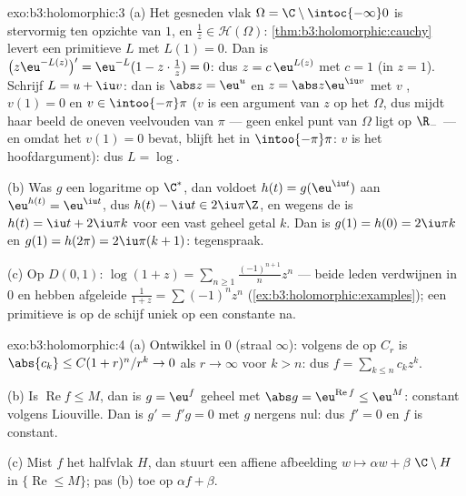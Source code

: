 \begin{solution}{exo:b3:holomorphic:3}
(a) Het gesneden vlak $\Omega = \C\setminus\intoc{-\infty}0$ is
stervormig ten opzichte van $1$, en $\frac1z \in \mathcal
H(\Omega)$: \cref{thm:b3:holomorphic:cauchy} levert een
primitieve $L$ met $L(1) = 0$. Dan is
$\bigl(z\eu^{-L(z)}\bigr)' = \eu^{-L}(1 - z\cdot\frac1z) = 0$:
dus $z = c\,\eu^{L(z)}$ met $c = 1$ (in $z = 1$). Schrijf $L = u
+ \iu v$: dan is $\abs z = \eu^u$ en $z = \abs z\eu^{\iu v}$ met
$v$ , $v(1) = 0$ en $v \in \intoo{-\pi}\pi$ ($v$ is een
 argument van $z$ op het  $\Omega$, dus mijdt
haar beeld de oneven veelvouden van $\pi$ --- geen enkel punt van
$\Omega$ ligt op $\R_-$ --- en omdat het $v(1) = 0$ bevat, blijft
het in $\intoo{-\pi}\pi$: $v$ is het hoofdargument): dus $L =
\log$.

(b) Was $g$ een  logaritme op $\C^*$, dan voldoet $h(t) =
g(\eu^{\iu t})$ aan $\eu^{h(t)} = \eu^{\iu t}$, dus $h(t) - \iu t
\in 2\iu\pi\Z$, en wegens de  is $h(t) = \iu t +
2\iu\pi k$ voor een vast geheel getal $k$. Dan is $g(1) = h(0) =
2\iu\pi k$ en $g(1) = h(2\pi) = 2\iu\pi(k + 1)$: tegenspraak.

(c) Op $D(0,1)$: $\log(1 + z) =
\sum_{n\geq1}\frac{(-1)^{n+1}}{n}z^n$ --- beide leden verdwijnen
in $0$ en hebben afgeleide $\frac1{1+z} = \sum(-1)^nz^n$
(\cref{ex:b3:holomorphic:examples}); een primitieve is op de
 schijf uniek op een constante na.
\end{solution}

\begin{solution}{exo:b3:holomorphic:4}
(a) Ontwikkel in $0$ (straal $\infty$): volgens de  op $C_r$ is $\abs{c_k} \leq C(1 + r)^n/r^k \to 0$ als
$r \to \infty$ voor $k > n$: dus $f = \sum_{k\leq n}c_kz^k$.

(b) Is $\operatorname{Re}f \leq M$, dan is $g = \eu^f$ geheel met
$\abs g = \eu^{\operatorname{Re}f} \leq \eu^M$: constant volgens
Liouville. Dan is $g' = f'g = 0$ met $g$ nergens nul: dus $f' =
0$ en $f$ is constant.

(c) Mist $f$ het halfvlak $H$, dan stuurt een affiene afbeelding
$w \mapsto \alpha w + \beta$ $\C\setminus H$ in
$\{\operatorname{Re} \leq M\}$; pas (b) toe op $\alpha f +
\beta$.
\end{solution}

